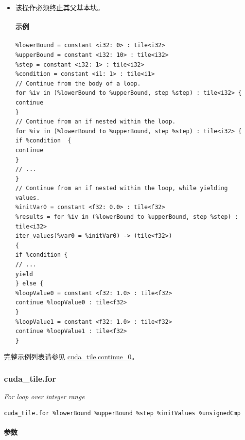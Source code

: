 \documentclass{article}
\begin{document}
\begin{itemize}
\item 该操作必须终止其父基本块。


\paragraph{示例}

\begin{lstlisting}
%lowerBound = constant <i32: 0> : tile<i32>
%upperBound = constant <i32: 10> : tile<i32>
%step = constant <i32: 1> : tile<i32>
%condition = constant <i1: 1> : tile<i1>
// Continue from the body of a loop.
for %iv in (%lowerBound to %upperBound, step %step) : tile<i32> {
continue
}
// Continue from an if nested within the loop.
for %iv in (%lowerBound to %upperBound, step %step) : tile<i32> {
if %condition  {
continue
}
// ...
}
// Continue from an if nested within the loop, while yielding values.
%initVar0 = constant <f32: 0.0> : tile<f32>
%results = for %iv in (%lowerBound to %upperBound, step %step) : tile<i32>
iter_values(%var0 = %initVar0) -> (tile<f32>)
{
if %condition {
// ...
yield
} else {
%loopValue0 = constant <f32: 1.0> : tile<f32>
continue %loopValue0 : tile<f32>
}
%loopValue1 = constant <f32: 1.0> : tile<f32>
continue %loopValue1 : tile<f32>
}
\end{lstlisting}

\end{itemize}
完整示例列表请参见 \href{https://docs.nvidia.com/cuda/tile-ir/latest/sections/appendix.html#example-cuda-tile-continue-0}{cuda\_tile.continue\_0}。



\subsubsection{cuda\_tile.for}

\textit{For loop over integer range}


\begin{lstlisting}
cuda_tile.for %lowerBound %upperBound %step %initValues %unsignedCmp
\end{lstlisting}

\paragraph{参数}
\end{document}
